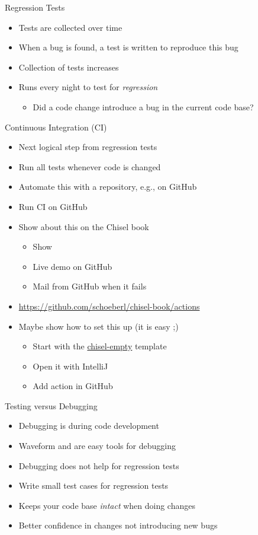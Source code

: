 \begin{frame}[fragile]{Regression Tests}
\begin{itemize}
\item Tests are collected over time
\item When a bug is found, a test is written to reproduce this bug
\item Collection of tests increases
\item Runs every night to test for \emph{regression}
\begin{itemize}
\item Did a code change introduce a bug in the current code base?
\end{itemize}
\end{itemize}
\end{frame}


\begin{frame}[fragile]{Continuous Integration (CI)}
\begin{itemize}
\item Next logical step from regression tests
\item Run all tests whenever code is changed
\item Automate this with a repository, e.g., on GitHub
\item Run CI on GitHub
\item Show about this on the Chisel book
\begin{itemize}
\item Show 
\item Live demo on GitHub
\item Mail from GitHub when it fails
\end{itemize}
\item \url{https://github.com/schoeberl/chisel-book/actions}
\item Maybe show how to set this up (it is easy ;)
\begin{itemize}
\item Start with the \href{https://github.com/schoeberl/chisel-empty}{chisel-empty} template
\item Open it with IntelliJ
\item Add action in GitHub
\end{itemize}
\end{itemize}
\end{frame}

\begin{frame}[fragile]{Testing versus Debugging}
\begin{itemize}
\item Debugging is during code development
\item Waveform and  are easy tools for debugging
\item Debugging does not help for regression tests
\item Write small test cases for regression tests
\item Keeps your code base \emph{intact} when doing changes
\item Better confidence in changes not introducing new bugs
\end{itemize}
\end{frame}


